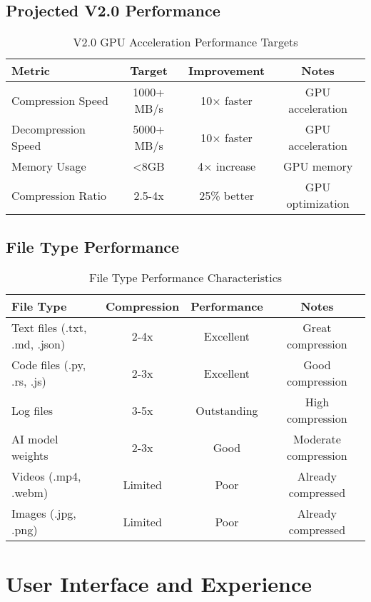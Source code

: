 \documentclass[12pt,a4paper]{article}
\begin{document}
\subsection{Projected V2.0 Performance}
\begin{table}[h]
\centering
\begin{tabular}{|l|c|c|c|}
\hline
\textbf{Metric} & \textbf{Target} & \textbf{Improvement} & \textbf{Notes} \\
\hline
Compression Speed & 1000+ MB/s & 10× faster & GPU acceleration \\
Decompression Speed & 5000+ MB/s & 10× faster & GPU acceleration \\
Memory Usage & <8GB & 4× increase & GPU memory \\
Compression Ratio & 2.5-4x & 25\% better & GPU optimization \\
\hline
\end{tabular}
\caption{V2.0 GPU Acceleration Performance Targets}
\end{table}

\subsection{File Type Performance}
\begin{table}[h]
\centering
\begin{tabular}{|l|c|c|c|}
\hline
\textbf{File Type} & \textbf{Compression} & \textbf{Performance} & \textbf{Notes} \\
\hline
Text files (.txt, .md, .json) & 2-4x & Excellent & Great compression \\
Code files (.py, .rs, .js) & 2-3x & Excellent & Good compression \\
Log files & 3-5x & Outstanding & High compression \\
AI model weights & 2-3x & Good & Moderate compression \\
Videos (.mp4, .webm) & Limited & Poor & Already compressed \\
Images (.jpg, .png) & Limited & Poor & Already compressed \\
\hline
\end{tabular}
\caption{File Type Performance Characteristics}
\end{table}

\newpage

\section{User Interface and Experience}
\end{document}
